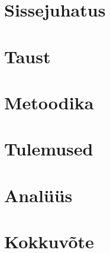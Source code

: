 

\chapter{Sissejuhatus}\label{chapter:introduction} %

\chapter{Taust}\label{chapter:introduction}


\chapter{Metoodika}\label{chapter:method}



\chapter{Tulemused}\label{chapter:results}

%

\chapter{Analüüs}\label{chapter:discussion}


\chapter{Kokkuvõte}\label{chapter:summary} 


